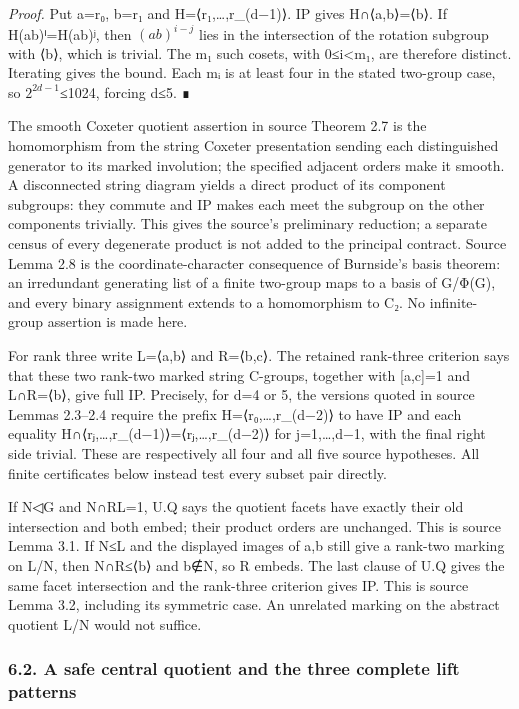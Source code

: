 \documentclass[
  11pt,
  a4paper,
]{article}
\begin{document}
\emph{Proof.} Put a=r₀, b=r₁ and H=⟨r₁,\ldots,r\_(d−1)⟩. IP gives
H∩⟨a,b⟩=⟨b⟩. If H(ab)ⁱ=H(ab)ʲ, then \((ab)^{i-j}\) lies in the
intersection of the rotation subgroup with ⟨b⟩, which is trivial. The m₁
such cosets, with 0≤i\textless m₁, are therefore distinct. Iterating
gives the bound. Each mᵢ is at least four in the stated two-group case,
so \(2^{2d-1}\)≤1024, forcing d≤5. ∎

The smooth Coxeter quotient assertion in source Theorem 2.7 is the
homomorphism from the string Coxeter presentation sending each
distinguished generator to its marked involution; the specified adjacent
orders make it smooth. A disconnected string diagram yields a direct
product of its component subgroups: they commute and IP makes each meet
the subgroup on the other components trivially. This gives the source's
preliminary reduction; a separate census of every degenerate product is
not added to the principal contract. Source Lemma 2.8 is the
coordinate-character consequence of Burnside's basis theorem: an
irredundant generating list of a finite two-group maps to a basis of
G/Φ(G), and every binary assignment extends to a homomorphism to C₂. No
infinite-group assertion is made here.

For rank three write L=⟨a,b⟩ and R=⟨b,c⟩. The retained rank-three
criterion says that these two rank-two marked string C-groups, together
with {[}a,c{]}=1 and L∩R=⟨b⟩, give full IP. Precisely, for d=4 or 5, the
versions quoted in source Lemmas 2.3--2.4 require the prefix
H=⟨r₀,\ldots,r\_(d−2)⟩ to have IP and each equality
H∩⟨rⱼ,\ldots,r\_(d−1)⟩=⟨rⱼ,\ldots,r\_(d−2)⟩ for j=1,\ldots,d−1, with the
final right side trivial. These are respectively all four and all five
source hypotheses. All finite certificates below instead test every
subset pair directly.

If N◁G and N∩RL=1, U.Q says the quotient facets have exactly their old
intersection and both embed; their product orders are unchanged. This is
source Lemma 3.1. If N≤L and the displayed images of a,b still give a
rank-two marking on L/N, then N∩R≤⟨b⟩ and b∉N, so R embeds. The last
clause of U.Q gives the same facet intersection and the rank-three
criterion gives IP. This is source Lemma 3.2, including its symmetric
case. An unrelated marking on the abstract quotient L/N would not
suffice.

\subsubsection{6.2. A safe central quotient and the three complete lift
patterns}\label{a-safe-central-quotient-and-the-three-complete-lift-patterns}
\end{document}
